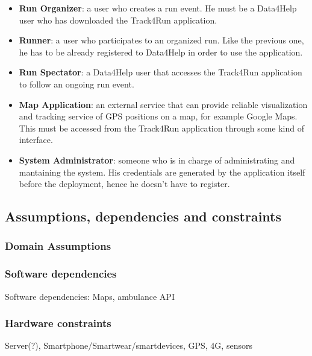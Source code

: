 \begin{itemize}
\item \textbf{Run Organizer}: a user who creates a run event. He must be a Data4Help user who has downloaded the Track4Run application.
 
\item \textbf{Runner}: a user who participates to an organized run. Like the previous one, he has to be already registered to Data4Help in order to use the application.

\item \textbf{Run Spectator}: a Data4Help user that accesses the Track4Run application to follow an ongoing run event.

\item \textbf{Map Application}: an external service that can provide reliable visualization and tracking service of GPS positions on a map, for example Google Maps. This must be accessed from the Track4Run application through some kind of interface.

\item \textbf{System Administrator}: someone who is in charge of administrating and mantaining the system. His credentials are generated by the application itself before the deployment, hence he doesn't have to register.

\end{itemize}
\subsection{Assumptions, dependencies and constraints}
\subsubsection{Domain Assumptions}
\subsubsection{Software dependencies}
Software dependencies: Maps, ambulance API
\subsubsection{Hardware constraints}
Server(?), Smartphone/Smartwear/smartdevices, GPS, 4G, sensors